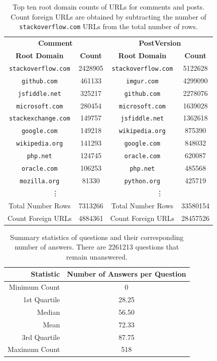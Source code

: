 \documentclass[a4paper,11pt, notitlepage]{report}
\theoremstyle{definition}
\numberwithin{equation}{section}		%
\begin{document}
\begin{table}[ht]
    \centering
    \begin{tabular}{cc|cc}
    \hline \multicolumn{2}{c}{\textbf{Comment}} & \multicolumn{2}{c}{\textbf{PostVersion}} \\
    \textbf{Root Domain} & \textbf{Count} & \textbf{Root Domain} & \textbf{Count} \\ \hline
    \texttt{stackoverflow.com} & 2428905 & \texttt{stackoverflow.com} & 5122628 \\
    \texttt{github.com} & 461133 & \texttt{imgur.com} & 4299090 \\
    \texttt{jsfiddle.net} & 325217 & \texttt{github.com} & 2278076 \\
    \texttt{microsoft.com} & 280454 & \texttt{microsoft.com} & 1639028\\
    \texttt{stackexchange.com} & 149757 & \texttt{jsfiddle.net} & 1362618 \\
    \texttt{google.com} & 149218 & \texttt{wikipedia.org} & 875390 \\
    \texttt{wikipedia.org} & 141293 & \texttt{google.com} & 848032 \\
    \texttt{php.net} & 124745 & \texttt{oracle.com} & 620087 \\
    \texttt{oracle.com} & 106253 & \texttt{php.net} & 485568 \\
    \texttt{mozilla.org} & 81330 & \texttt{python.org} & 425719 \\ 
    \multicolumn{2}{c}{\vdots} & \multicolumn{2}{c}{\vdots} \\ \hline
    Total Number Rows & 7313266 & Total Number Rows & 33580154 \\
    Count Foreign URLs & 4884361 & Count Foreign URLs & 28457526 \\
    \end{tabular}
    \caption{Top ten root domain counts of URLs for comments and posts. Count foreign URLs are obtained by subtracting the number of \texttt{stackoverflow.com} URLs from the total number of rows.}
    \label{tab:foreign-urls}
\end{table}

\begin{table}[ht]
\centering
\begin{tabular}{rc}
\hline
\textbf{Statistic} & \textbf{Number of Answers per Question} \\ \hline
Minimum Count   & 0 \\
1st Quartile    & 28.25 \\
Median          & 56.50 \\
Mean            & 72.33 \\
3rd Quartile    & 87.75 \\
Maximum Count   & 518   \\
\end{tabular}
\caption{Summary statistics of questions and their corresponding number of answers. There are 2261213 questions that remain unanswered.}
\label{table:questions-to-num-answers}
\end{table}
\end{document}
